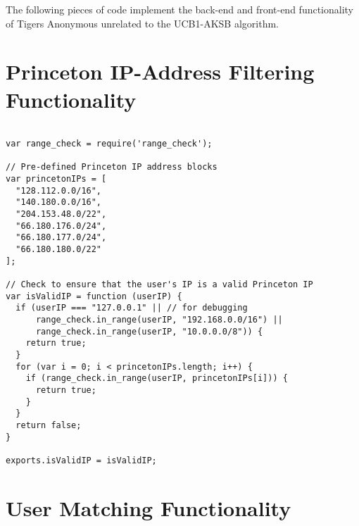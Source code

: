 The following pieces of code implement the back-end and front-end functionality of Tigers Anonymous unrelated to the UCB1-AKSB algorithm.

\section{Princeton IP-Address Filtering Functionality}

\begin{lstlisting}

var range_check = require('range_check');

// Pre-defined Princeton IP address blocks
var princetonIPs = [
  "128.112.0.0/16",
  "140.180.0.0/16",
  "204.153.48.0/22",
  "66.180.176.0/24",
  "66.180.177.0/24",
  "66.180.180.0/22"
];

// Check to ensure that the user's IP is a valid Princeton IP
var isValidIP = function (userIP) {
  if (userIP === "127.0.0.1" || // for debugging
      range_check.in_range(userIP, "192.168.0.0/16") ||
      range_check.in_range(userIP, "10.0.0.0/8")) {
    return true;
  }
  for (var i = 0; i < princetonIPs.length; i++) {
    if (range_check.in_range(userIP, princetonIPs[i])) {
      return true;
    }
  }
  return false;
}

exports.isValidIP = isValidIP;

\end{lstlisting}

\section{User Matching Functionality}

